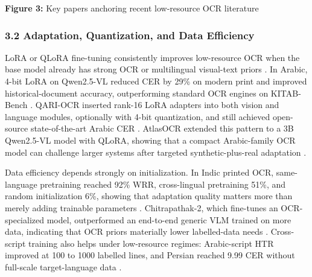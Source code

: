     
    \textbf{Figure 3:} Key papers anchoring recent low-resource OCR literature
    
    
    \subsubsection*{3.2 Adaptation, Quantization, and Data Efficiency}
    
    
    LoRA or QLoRA fine-tuning consistently improves low-resource OCR when the base model already has strong OCR or multilingual visual-text priors  \cite{Elkousy2026Domain-Specific} \cite{Momayiz2026AtlasOCR:} \cite{Faraz2026Designing} \cite{Xu2026Multilingual}. In Arabic, 4-bit LoRA on Qwen2.5-VL reduced CER by 29\% on modern print and improved historical-document accuracy, outperforming standard OCR engines on KITAB-Bench  \cite{Elkousy2026Domain-Specific}. QARI-OCR inserted rank-16 LoRA adapters into both vision and language modules, optionally with 4-bit quantization, and still achieved open-source state-of-the-art Arabic CER  \cite{Wasfy2025QARI-OCR:}. AtlasOCR extended this pattern to a 3B Qwen2.5-VL model with QLoRA, showing that a compact Arabic-family OCR model can challenge larger systems after targeted synthetic-plus-real adaptation  \cite{Momayiz2026AtlasOCR:}.
    
    
    Data efficiency depends strongly on initialization. In Indic printed OCR, same-language pretraining reached 92\% WRR, cross-lingual pretraining 51\%, and random initialization 6\%, showing that adaptation quality matters more than merely adding trainable parameters  \cite{Manna2025Label-Free}. Chitrapathak-2, which fine-tunes an OCR-specialized model, outperformed an end-to-end generic VLM trained on more data, indicating that OCR priors materially lower labelled-data needs  \cite{Faraz2026Designing}. Cross-script training also helps under low-resource regimes: Arabic-script HTR improved at 100 to 1000 labelled lines, and Persian reached 9.99 CER without full-scale target-language data  \cite{Al-Azzawi2026Cross-Lingual}.
    
